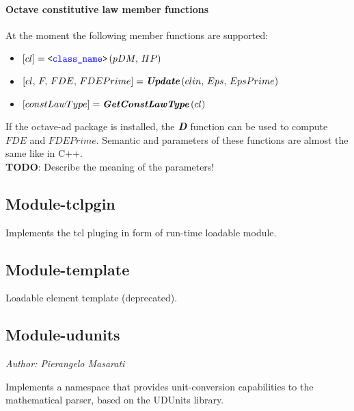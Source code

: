 \paragraph{Octave constitutive law member functions}
At the moment the following member functions are supported:
\begin{itemize}
\item $\left[cl\right] = \texttt{<\textcolor{blue}{class\_name}>}\left(pDM,\,HP\right)$
\item $\left[cl,\,F,\,FDE,\,FDEPrime\right] = \textit{\textbf{Update}}\left(clin,\,Eps,\,EpsPrime\right)$
\item $\left[constLawType\right] = \textit{\textbf{GetConstLawType}}\left(cl\right)$
\end{itemize}
If the octave-ad package is installed, the $\textit{\textbf{D}}$ function can be used to compute $FDE$ and $FDEPrime$.
Semantic and parameters of these functions are almost the same like in C++. \\
\textbf{TODO}: Describe the meaning of the parameters!

\subsection{Module-tclpgin}
Implements the tcl pluging in form of run-time loadable module.
 
\subsection{Module-template}
Loadable element template (deprecated).

\subsection{Module-udunits}
\emph{Author: Pierangelo Masarati}

\noindent
Implements a namespace that provides unit-conversion capabilities
to the mathematical parser, based on the UDUnits library.

